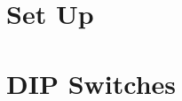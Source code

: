 \documentclass[oneside]{book}
\begin{document}
\section{Set Up}

\section{DIP Switches}



















\end{document}
